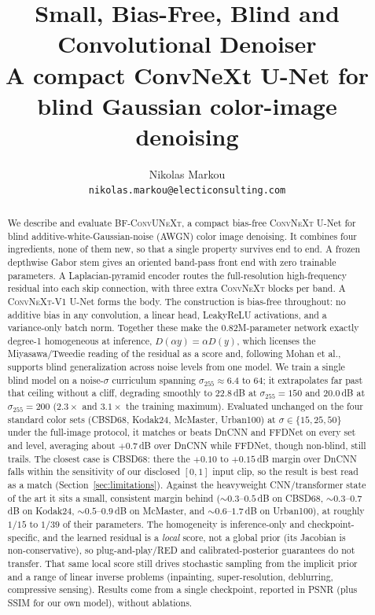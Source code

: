 \documentclass{article}
\title{Small, Bias-Free, Blind and Convolutional Denoiser\\
\large{A compact ConvNeXt U-Net for blind Gaussian color-image denoising}}
\author{
  Nikolas Markou \\
  \texttt{nikolas.markou@electiconsulting.com}
}
\date{}
\newcommand{\model}{\textsc{BF-ConvUNeXt}}
\newcommand{\convnext}{\textsc{ConvNeXt}}
\newcommand{\sigpx}{\sigma_{255}}
\begin{document}
\maketitle

\begin{abstract}
We describe and evaluate \model{}, a compact bias-free \convnext{} U-Net for blind additive-white-Gaussian-noise (AWGN) color image denoising. It combines four ingredients, none of them new, so that a single property survives end to end. A frozen depthwise Gabor stem gives an oriented band-pass front end with zero trainable parameters. A Laplacian-pyramid encoder routes the full-resolution high-frequency residual into each skip connection, with three extra \convnext{} blocks per band. A \convnext{}-V1 U-Net forms the body. The construction is bias-free throughout: no additive bias in any convolution, a linear head, LeakyReLU activations, and a variance-only batch norm. Together these make the $0.82$M-parameter network exactly degree-1 homogeneous at inference, $D(\alpha y)=\alpha D(y)$, which licenses the Miyasawa/Tweedie reading of the residual as a score and, following Mohan et al., supports blind generalization across noise levels from one model. We train a single blind model on a noise-$\sigma$ curriculum spanning $\sigpx\!\approx\!6.4$ to $64$; it extrapolates far past that ceiling without a cliff, degrading smoothly to $22.8$\,dB at $\sigpx{=}150$ and $20.0$\,dB at $\sigpx{=}200$ ($2.3\times$ and $3.1\times$ the training maximum). Evaluated unchanged on the four standard color sets (CBSD68, Kodak24, McMaster, Urban100) at $\sigma\!\in\!\{15,25,50\}$ under the full-image protocol, it matches or beats DnCNN and FFDNet on every set and level, averaging about $+0.7$\,dB over DnCNN while FFDNet, though non-blind, still trails. The closest case is CBSD68: there the $+0.10$ to $+0.15$\,dB margin over DnCNN falls within the sensitivity of our disclosed $[0,1]$ input clip, so the result is best read as a match (Section~\ref{sec:limitations}). Against the heavyweight CNN/transformer state of the art it sits a small, consistent margin behind ($\sim0.3$--$0.5$\,dB on CBSD68, $\sim0.3$--$0.7$\,dB on Kodak24, $\sim0.5$--$0.9$\,dB on McMaster, and $\sim0.6$--$1.7$\,dB on Urban100), at roughly $1/15$ to $1/39$ of their parameters. The homogeneity is inference-only and checkpoint-specific, and the learned residual is a \emph{local} score, not a global prior (its Jacobian is non-conservative), so plug-and-play/RED and calibrated-posterior guarantees do not transfer. That same local score still drives stochastic sampling from the implicit prior and a range of linear inverse problems (inpainting, super-resolution, deblurring, compressive sensing). Results come from a single checkpoint, reported in PSNR (plus SSIM for our own model), without ablations.
\end{abstract}
\end{document}
